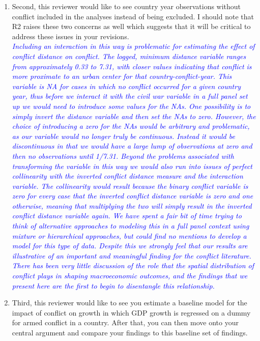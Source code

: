 \begin{enumerate}
\item Second, this reviewer would like to see country year observations without conflict included in the analyses instead of being excluded. I should note that R2 raises these two concerns as well which suggests that it will be critical to address these issues in your revisions. \\

\textcolor{blue}{\emph{
	Including an interaction in this way is problematic for estimating the effect of conflict distance on conflict. The logged, minimum distance variable ranges from approximately 0.33 to 7.31, with closer values indicating that conflict is more proximate to an urban center for that country-conflict-year. This variable is NA for cases in which no conflict occurred for a given country year, thus before we interact it with the civil war variable in a full panel set up we would need to introduce some values for the NAs. One possibility is to simply invert the distance variable and then set the NAs to zero. However, the choice of introducing a zero for the NAs would be arbitrary and problematic, as our variable would no longer truly be continuous. Instead it would be discontinuous in that we would have a large lump of observations at zero and then no observations until 1/7.31. Beyond the problems associated with transforming the variable in this way we would also run into issues of perfect collinearity with the inverted conflict distance measure and the interaction variable. The collinearity would result because the binary conflict variable is zero for every case that the inverted conflict distance variable is zero and one otherwise, meaning that multiplying the two will simply result in the inverted conflict distance variable again. 
	We have spent a fair bit of time trying to think of alternative approaches to modeling this in a full panel context using mixture or hierarchical approaches, but could find no mentions to develop a model for this type of data. 
	Despite this we strongly feel that our results are illustrative of an important and meaningful finding for the conflict literature. There has been very little discussion of the role that the spatial distribution of conflict plays in shaping macroeconomic outcomes, and the findings that we present here are the first to begin to disentangle this relationship.
}}

\item Third, this reviewer would like to see you estimate a baseline model for the impact of conflict on growth in which GDP growth is regressed on a dummy for armed conflict in a country. After that, you can then move onto your central argument and compare your findings to this baseline set of findings. \\


\end{enumerate}
